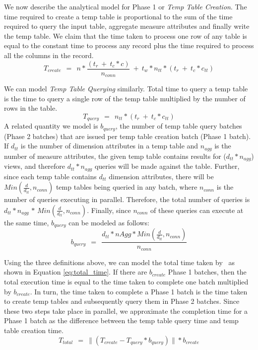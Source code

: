We now describe the analytical model for Phase 1 or {\it Temp Table Creation}.
The time required to create a temp table is proportional to the sum of the time
required to query the input table, aggregate measure attributes and finally
write the temp table. We claim that the time taken to process one row of any
table is equal to the constant time to process any record plus the time required
to process all the columns in the record.
\begin{equation*}
T_{create}\ \ =\ \ n \ast \frac{(t_r\ +\ t_c \ast c)}{n_{conn}} \ +\ t_w
\ast n_{tt} \ast (t_r\ +\ t_c \ast c_{tt})
\label{eq:create_time}
\end{equation*}

We can model {\it Temp Table Querying} similarly. Total time to query a temp
table is the time to query a single row of the temp table multiplied by the
number of rows in the table.
\begin{equation*}
T_{query}\ \ =\ \ n_{tt} \ast (t_r\ +\ t_c \ast c_{tt}) 
\label{eq:query_time}
\end{equation*}
A related quantity we model is $b_{query}$, the number of temp table query
batches (Phase 2 batches) that are issued per temp table creation batch (Phase 1 batch).
If $d_{tt}$ is the number of dimension attributes in a temp table and $n_{agg}$
is the number of measure attributes, the given temp table contains results
for ($d_{tt} \ast n_{agg}$) views, and therefore $d_{tt} \ast n_{agg}$ queries
will be made against the table. Further, since each temp table contains $d_{tt}$
dimension attributes, there will be $Min(\frac{d}{d_{tt}}, n_{conn})$ temp
tables being queried in any batch, where $n_{conn}$ is the number of queries executing
in parallel. Therefore, the total number of queries is $d_{tt} \ast n_{agg}$
$\ast$ $Min(\frac{d}{d_{tt}}, n_{conn})$. Finally, since $n_{conn}$ of these queries
can execute at the same time, $b_{query}$ can be modeled as follows:
\begin{equation*}
b_{query}\ \ =\ \ \frac{d_{tt} \ast nAgg \ast Min(\frac{d}{d_{tt}},
n_{conn})}{n_{conn}}
\end{equation*}

Using the three definitions above, we can model the total time taken by \SeeDB\
as shown in Equation \ref{eq:total_time}. If there are $b_{create}$ Phase 1
batches, then the total execution time is equal to the time taken to complete
one batch multiplied by $b_{create}$. In turn, the time taken to complete a
Phase 1 batch is the time taken to create temp tables and subsequently query
them in Phase 2 batches.
Since these two steps take place in parallel, we approximate the completion time
for a Phase 1 batch as the difference between the temp table query time and temp
table creation time.
\begin{equation*}
T_{total}\ \ =\ \|(T_{create} - T_{query} \ast b_{query})\| \ast b_{create}
\label{eq:total_time}
\end{equation*}

